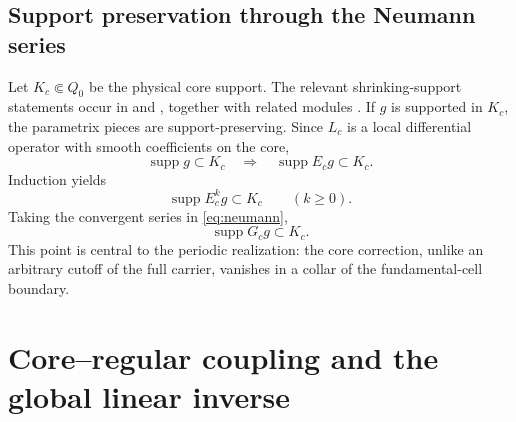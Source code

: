 \documentclass[11pt]{article}
\numberwithin{equation}{section}
\newcommand{\supp}{\operatorname{supp}}
\begin{document}
\subsection{Support preservation through the Neumann series}
Let \(K_c\Subset Q_0\) be the physical core support.  The relevant shrinking-support statements occur in  and , together with related modules \cite{OpenAIRepo2026}.  If \(g\) is supported in \(K_c\), the parametrix pieces are support-preserving.  Since \(L_c\) is a local differential operator with smooth coefficients on the core,
\begin{equation}
\supp g\subset K_c\quad\Longrightarrow\quad
\supp E_cg\subset K_c.
\label{eq:Esupport}
\end{equation}
Induction yields
\begin{equation}
\supp E_c^kg\subset K_c\qquad(k\ge0).
\label{eq:Eksupport}
\end{equation}
Taking the convergent series in \eqref{eq:neumann},
\begin{equation}
\boxed{\supp G_cg\subset K_c.}
\label{eq:Gcsupport}
\end{equation}
This point is central to the periodic realization: the core correction, unlike an arbitrary cutoff of the full carrier, vanishes in a collar of the fundamental-cell boundary.

\section{Core--regular coupling and the global linear inverse}\label{sec:globalinverse}
\end{document}
